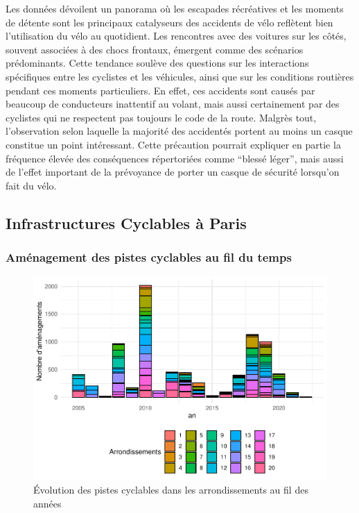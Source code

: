 \documentclass[french,]{compterendu}
\theoremstyle{urcastyle}
\theoremstyle{remark}
\begin{document}
Les données dévoilent un panorama où les escapades récréatives et les moments de détente sont les principaux catalyseurs des accidents de vélo reflètent bien l'utilisation du vélo au quotidient.
Les rencontres avec des voitures sur les côtés, souvent associées à des chocs frontaux, émergent comme des scénarios prédominants. Cette tendance soulève des questions sur les interactions spécifiques entre les cyclistes et les véhicules, ainsi que sur les conditions routières pendant ces moments particuliers. En effet, ces accidents sont causés par beaucoup de conducteurs inattentif au volant, mais aussi certainement par des cyclistes qui ne respectent pas toujours le code de la route.
Malgrès tout, l'observation selon laquelle la majorité des accidentés portent au moins un casque constitue un point intéressant. Cette précaution pourrait expliquer en partie la fréquence élevée des conséquences répertoriées comme ``blessé léger'', mais aussi de l'effet important de la prévoyance de porter un casque de sécurité lorsqu'on fait du vélo.

\hypertarget{infrastructures-cyclables-uxe0-paris}{%
\subsection{Infrastructures Cyclables à Paris}\label{infrastructures-cyclables-uxe0-paris}}

\hypertarget{amuxe9nagement-des-pistes-cyclables-au-fil-du-temps}{%
\subsubsection{Aménagement des pistes cyclables au fil du temps}\label{amuxe9nagement-des-pistes-cyclables-au-fil-du-temps}}

\begin{figure}[H]

{\centering \includegraphics[width=0.9\linewidth]{Rapport_ADD_LEO-GABET_files/figure-latex/arrPARISdetails-1} 

}

\caption{Évolution des pistes cyclables dans les arrondissements au fil des années}\label{fig:arrPARISdetails}
\end{figure}
\end{document}
